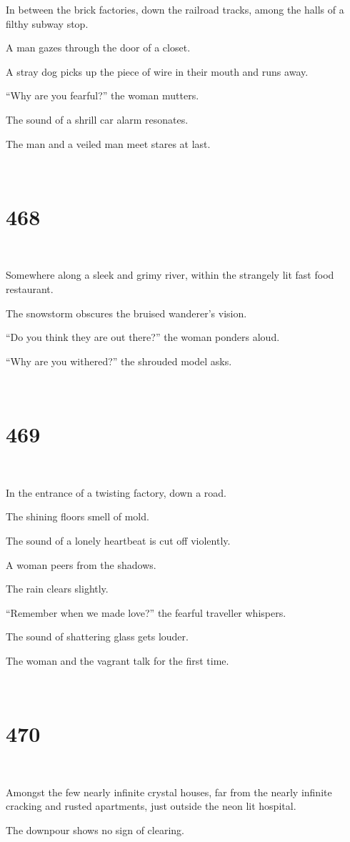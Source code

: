 \documentclass{report}
\begin{document}
In between the brick factories, down the railroad tracks, among the halls of a filthy subway stop.

A man gazes through the door of a closet.

A stray dog picks up the piece of wire in their mouth and runs away.

``Why are you fearful?'' the woman mutters.

The sound of a shrill car alarm resonates.

The man and a veiled man meet stares at last.

~
\chapter*{468}
~

Somewhere along a sleek and grimy river, within the strangely lit fast food restaurant.

The snowstorm obscures the bruised wanderer's vision.

``Do you think they are out there?'' the woman ponders aloud.

``Why are you withered?'' the shrouded model asks.

~
\chapter*{469}
~

In the entrance of a twisting factory, down a road.

The shining floors smell of mold.

The sound of a lonely heartbeat is cut off violently.

A woman peers from the shadows.

The rain clears slightly.

``Remember when we made love?'' the fearful traveller whispers.

The sound of shattering glass gets louder.

The woman and the vagrant talk for the first time.

~
\chapter*{470}
~

Amongst the few nearly infinite crystal houses, far from the nearly infinite cracking and rusted apartments, just outside the neon lit hospital.

The downpour shows no sign of clearing.
\end{document}
